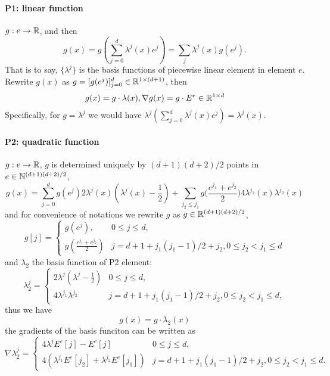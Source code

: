 \paragraph{P1: linear function} $g:e\to\mathbb{R}$, and then
\[g(x)=g({\textstyle\sum_{j=0}^{d}}\lambda^j(x)e^j)=\sum_{j}\lambda^j(x)g(e^j).\]
That is to say, $\{\lambda^j\}$ is the basis functions of piecewise linear element in element $e$. 
Rewrite $g(x)$ as $g=[g(e^j)]_{j=0}^d\in\mathbb{R}^{1\times(d+1)}$, then 
\[g(x)=g\cdot\lambda(x),\nabla g(x)=g\cdot E^e\in\mathbb{R}^{1\times d}\]
Specifically, for $g=\lambda^j$ we would have $\lambda^j(\sum_{j=0}^{d}\lambda^j(x)e^j)=\lambda^j(x)$.

\paragraph{P2: quadratic function} $g:e\to\mathbb{R}$, 
$g$ is determined uniquely by $(d+1)(d+2)/2$ points in 
$e\in\mathbb{N}^{(d+1)(d+2)/2}$, 
\[g(x)=\sum_{j=0}^dg(e^j)2\lambda^j(x)(\lambda^j(x)-\frac12)+
\sum_{j_2\leq j_1}g\big(\frac{e^{j_1}+e^{j_2}}2\big)4\lambda^{j_1}(x)\lambda^{j_2}(x)\]
and for convenience of notations we rewrite $g$ as $g\in\mathbb{R}^{(d+1)(d+2)/2}$, 
\begin{equation}\label{eq:quadratic-freedom}
  g[j]=\left\{
  \begin{array}{ll}
    g(e^j), & 0\leq j\leq d, \\
    g(\frac{e^{j_1}+e^{j_2}}2) & j=d+1+j_1(j_1-1)/2+j_2,0\leq j_2<j_1\leq d
  \end{array}
  \right.
\end{equation}
and $\lambda_2$ the basis function of P2 element:
\[
  \lambda_2^j=\left\{
  \begin{array}{ll}
    2\lambda^j(\lambda^j-\frac12) & 0\leq j\leq d, \\
    4\lambda^{j_1}\lambda^{j_2}   & j=d+1+j_1(j_1-1)/2+j_2,0\leq j_2<j_1\leq d,
  \end{array}
  \right.
\]
thus we have
\[g(x)=g\cdot\lambda_2(x)\]
the gradients of the basis funciton can be written as
\[
  \nabla\lambda_2^j=\left\{
  \begin{array}{ll}
    4\lambda^jE^e[j]-E^e[j]                        & 0\leq j\leq d, \\
    4(\lambda^{j_1}E^e[j_2]+\lambda^{j_2}E^e[j_1]) & 
    j=d+1+j_1(j_1-1)/2+j_2,0\leq j_2<j_1\leq d.
  \end{array}
  \right.
\]
